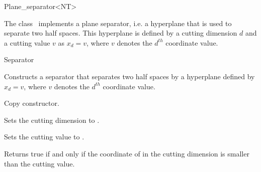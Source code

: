 

\begin{ccRefClass}{Plane_separator<NT>}  %


\ccDefinition

  
The class \ccRefName\ implements a plane separator, i.e. a hyperplane that is used to separate two half spaces.
This hyperplane is defined by a cutting dimension $d$ and a cutting value $v$
as $x_d=v$, where $v$ denotes the $d^{th}$ coordinate value.


\ccIsModel

Separator

\ccCreation
{}  %



{Constructs a separator that separates two half spaces by a hyperplane
defined by $x_d=v$, where $v$ denotes the $d^{th}$ coordinate value.}

{Copy constructor.}

\ccOperations

{Sets the cutting dimension to . }

{Sets the cutting value to . }



{Returns true if and only if the coordinate of  in the cutting dimension is smaller than the cutting value.}


\end{ccRefClass}
